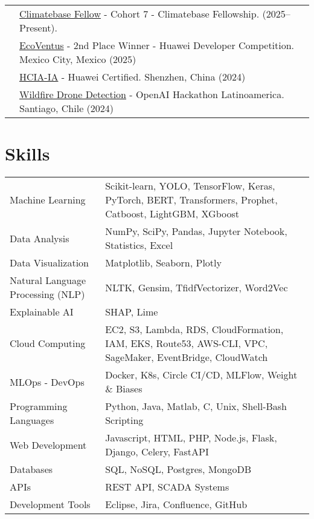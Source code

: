 \documentclass[a4paper,12pt]{article}
\begin{document}
\begin{tabularx}{\linewidth}{@{}l X@{}}
& \normalsize{\href{https://climatebase.org/fellowship}{Climatebase Fellow} - Cohort 7 - Climatebase Fellowship.  (2025–Present).}\\
& \normalsize{\href{https://github.com/AzulRK22/queenDrones}{EcoVentus} -  2nd Place Winner - Huawei Developer Competition. Mexico City, Mexico (2025)}\\
& \normalsize{\href{https://github.com/dcerdac/MachineLearningProjects/blob/master/010102001521809623012377209.pdf}{HCIA-IA} - Huawei Certified. Shenzhen, China (2024)}\\
& \normalsize{\href{https://github.com/dcerdac/keepnai}{Wildfire Drone Detection} - OpenAI Hackathon Latinoamerica. Santiago, Chile (2024)}\\


\end{tabularx}
\section{Skills}
\begin{tabularx}{\linewidth}{@{}l X@{}}
Machine Learning & \normalsize{Scikit-learn, YOLO, TensorFlow, Keras, PyTorch, BERT, Transformers, Prophet, Catboost, LightGBM, XGboost}\\
Data Analysis & \normalsize{NumPy, SciPy, Pandas, Jupyter Notebook, Statistics, Excel}\\
Data Visualization & \normalsize{Matplotlib, Seaborn, Plotly}\\
Natural Language Processing (NLP) & \normalsize{NLTK, Gensim, TfidfVectorizer, Word2Vec}\\
Explainable AI & \normalsize{SHAP, Lime}\\
Cloud Computing & \normalsize{EC2, S3, Lambda, RDS, CloudFormation, IAM, EKS, Route53, AWS-CLI, VPC, SageMaker, EventBridge, CloudWatch}\\
MLOps - DevOps & \normalsize{Docker, K8s, Circle CI/CD, MLFlow, Weight \& Biases}\\
Programming Languages & \normalsize{Python, Java, Matlab, C, Unix, Shell-Bash Scripting}\\
Web Development & \normalsize{Javascript, HTML, PHP, Node.js, Flask, Django, Celery, FastAPI}\\
Databases & \normalsize{SQL, NoSQL, Postgres, MongoDB}\\
APIs & \normalsize{REST API, SCADA Systems}\\
Development Tools & \normalsize{Eclipse, Jira, Confluence, GitHub}\\
\end{tabularx}
\vfill
\end{document}
